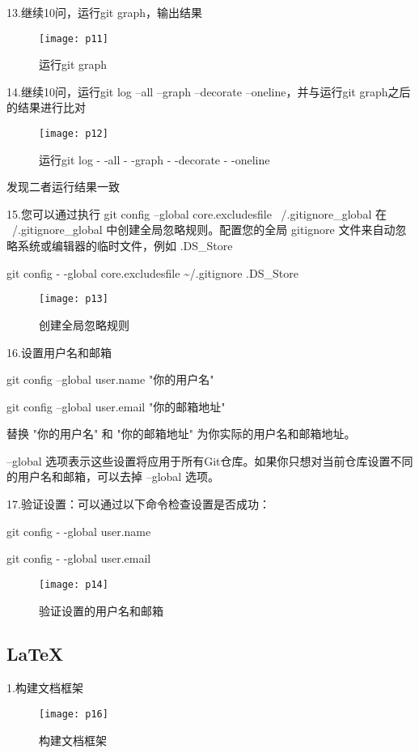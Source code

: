 \documentclass[a4paper ,12pt]{article}
\begin{document}
  13.继续10问，运行git graph，输出结果
  \begin{figure}[h]
  	\centering
  	\texttt{[image: p11]}
  	\caption{运行git graph}
  \end{figure}
  
  14.继续10问，运行git log --all --graph --decorate --oneline，并与运行git graph之后的结果进行比对
   \begin{figure}[h]
  	\centering
  	\texttt{[image: p12]}
  	\caption{运行git log - -all - -graph - -decorate - -oneline}
  \end{figure}
  
  发现二者运行结果一致
  
  15.您可以通过执行 git config –global core.excludesfile ~/.gitignore\_global 在 ~/.gitignore\_global 中创建全局忽略规则。配置您的全局 gitignore 文件来自动忽略系统或编辑器的临时文件，例如 .DS\_Store
  
  git config - -global core.excludesfile \textasciitilde/.gitignore .DS\_Store
  \begin{figure}[h]
  	\centering
  	\texttt{[image: p13]}
  	\caption{创建全局忽略规则}
  \end{figure}
  
  16.设置用户名和邮箱
  
  git config --global user.name "你的用户名"
  
   git config --global user.email "你的邮箱地址"
  
  替换 "你的用户名" 和 "你的邮箱地址" 为你实际的用户名和邮箱地址。
  
  --global 选项表示这些设置将应用于所有Git仓库。如果你只想对当前仓库设置不同的用户名和邮箱，可以去掉 --global 选项。
  
  17.验证设置：可以通过以下命令检查设置是否成功：
  
  git config - -global user.name
  
  git config - -global user.email
  \begin{figure}[h]
  	\centering
  	\texttt{[image: p14]}
  	\caption{验证设置的用户名和邮箱}
  \end{figure}
  
  \subsection{LaTeX}
  1.构建文档框架
  \begin{figure}[h]
  	\centering
  	\texttt{[image: p16]}
  	\caption{构建文档框架}
  \end{figure}
  
\end{document}
